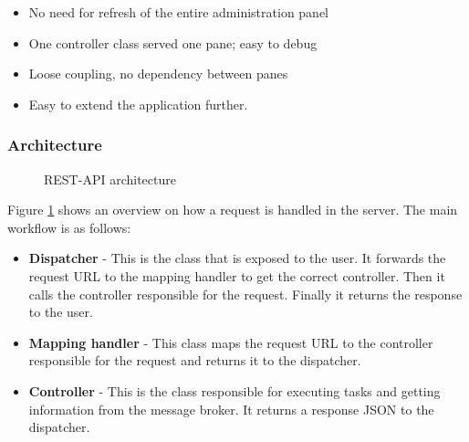 \begin{itemize}
    \item No need for refresh of the entire administration panel
    \item One controller class served one pane; easy to debug
    \item Loose coupling, no dependency between panes
    \item Easy to extend the application further.
\end{itemize}

\subsubsection{Architecture}

\begin{center}
  \begin{figure}[ht!]
    \caption{REST-API architecture}
    \label{fig:spring}
  \end{figure}
\end{center}

Figure \ref{fig:spring} shows an overview on how a request is handled in the server. The main workflow is as follows:

\begin{itemize}
    \item\textbf{Dispatcher} -  This is the class that is exposed to the user. It forwards the request URL to the mapping handler to get the correct controller. Then it calls the controller responsible for the request. Finally it returns the response to the user. 
    \item\textbf{Mapping handler} - This class maps the request URL to the controller responsible for the request and returns it to the dispatcher. 
    \item\textbf{Controller} - This is the class responsible for executing tasks and getting information from the message broker. It returns a response JSON to the dispatcher.  
\end{itemize}

